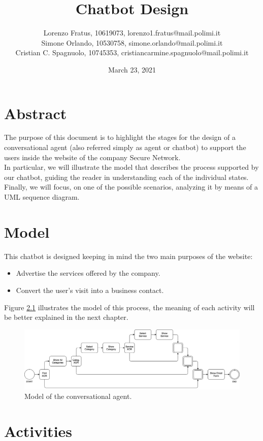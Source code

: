 \documentclass[12pt]{report}
\title{Chatbot Design}
\author{Lorenzo Fratus, 10619073, lorenzo1.fratus@mail.polimi.it \\
Simone Orlando, 10530758, simone.orlando@mail.polimi.it \\
Cristian C. Spagnuolo, 10745353, cristiancarmine.spagnuolo@mail.polimi.it}
\date{March 23, 2021}
\begin{document}
\maketitle
\tableofcontents

\chapter{Abstract}
The purpose of this document is to highlight the stages for the 
design of a conversational agent (also referred simply as agent or chatbot) to support 
the users inside the website of the company Secure Network.\\
In particular, we will illustrate the model that describes the process
supported by our chatbot, guiding the reader in understanding each of
the individual states.\\
Finally, we will focus, on one of the possible scenarios, analyzing
it by means of a UML sequence diagram.

\chapter{Model}
This chatbot is designed keeping in mind the two main purposes of the
website:
\begin{itemize}
	\item Advertise the services offered by the company.
	\item Convert the user's visit into a business contact. 
\end{itemize}
\noindent
Figure \ref{fig:model} illustrates the model of this process, the 
meaning of each activity will be better explained in the next chapter.

\begin{figure}[h]
	\centering
	\includegraphics[width=\textwidth]{model}
	\caption{Model of the conversational agent.}
	\label{fig:model}
\end{figure}

\chapter{Activities}
\end{document}
